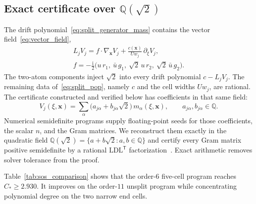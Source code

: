 \documentclass[aps,prx,reprint,nofootinbib,longbibliography,floatfix]{revtex4-2}
\theoremstyle{plain}
\theoremstyle{remark}
\newcommand{\ii}{\mathrm{i}}
\newcommand{\xv}{\boldsymbol{x}}
\begin{document}
\subsection{Exact certificate over \texorpdfstring{$\mathbb{Q}(\sqrt{2})$}{Q(sqrt(2))}}
\label{sec:split_exact}

The drift polynomial~\eqref{eq:split_generator_mass} contains the vector
field~\eqref{eq:vector_field},
\begin{equation}
\begin{gathered}
L_jV_j
= f\cdot\nabla_{\xv} V_j+\frac{c(\xv)}{Uw_j}\,\partial_\xi V_j,\\
f=-\frac{\ii}{2}\bigl(u\,r_1,\ \bar u\,g_1,\ \sqrt2\,u\,r_2,\ \sqrt2\,\bar u\,g_2\bigr).
\end{gathered}
\label{eq:Lj_sqrt2}
\end{equation}
The two-atom components inject $\sqrt{2}$ into every drift polynomial
$c-L_jV_j$. The remaining data of~\eqref{eq:split_pop}, namely $c$ and the
cell widths $Uw_j$, are rational. The certificate constructed and verified below has coefficients in
that same field:
\begin{equation}
V_j(\xi,\xv)
=\sum_{\alpha}\bigl(a_{j\alpha}+b_{j\alpha}\sqrt{2}\bigr)\,m_{\alpha}(\xi,\xv),
\qquad a_{j\alpha},b_{j\alpha}\in\mathbb{Q}.
\label{eq:Vj_qsqrt2}
\end{equation}
Numerical semidefinite programs supply floating-point seeds for those
coefficients, the scalar $n$, and the Gram matrices. We reconstruct them
exactly in the quadratic field
$\mathbb{Q}(\sqrt{2})=\{a+b\sqrt{2}:a,b\in\mathbb{Q}\}$ and certify every Gram
matrix positive semidefinite by a rational $\mathrm{LDL}^{\mathsf T}$
factorization~\cite{Peyrl08,Rump06}. Exact arithmetic removes solver tolerance
from the proof.

Table~\ref{tab:sos_comparison} shows that the order-$6$ five-cell program reaches
$C_*\ge2.930$. It improves on the order-$11$ unsplit program while concentrating
polynomial degree on the two narrow end cells.
\end{document}
